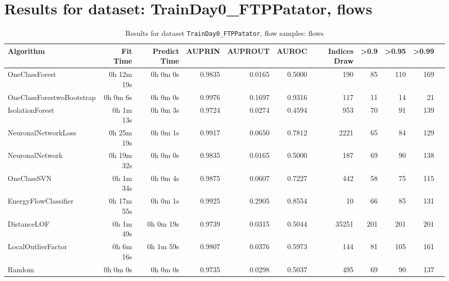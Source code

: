\documentclass{article}
\begin{document}
\section*{Results for dataset: TrainDay0_FTPPatator, flows}
\begin{table}[h!]
\centering
\caption{Results for dataset \texttt{TrainDay0_FTPPatator}, flow samples: flows}
\label{tab:trainday0ftppatator_flows}
\begin{tabular}{lrrrrrrrrrr}
\toprule
Algorithm & Fit Time & Predict Time & AUPRIN & AUPROUT & AUROC & Indices Draw & >0.9 & >0.95 & >0.99 \\
\midrule
OneClassForest & 0h 12m 19s & 0h 0m 0s & 0.9835 & 0.0165 & 0.5000 & 190 & 85 & 110 & 169 \\
OneClassForestwoBootstrap & 0h 0m 6s & 0h 0m 0s & 0.9976 & 0.1697 & 0.9316 & 117 & 11 & 14 & 21 \\
IsolationForest & 0h 1m 13s & 0h 0m 3s & 0.9724 & 0.0274 & 0.4594 & 953 & 70 & 91 & 139 \\
NeuronalNetworkLoss & 0h 25m 19s & 0h 0m 1s & 0.9917 & 0.0650 & 0.7812 & 2221 & 65 & 84 & 129 \\
NeuronalNetwork & 0h 19m 32s & 0h 0m 0s & 0.9835 & 0.0165 & 0.5000 & 187 & 69 & 90 & 138 \\
OneClassSVN & 0h 1m 34s & 0h 0m 4s & 0.9875 & 0.0607 & 0.7227 & 442 & 58 & 75 & 115 \\
EnergyFlowClassifier & 0h 17m 55s & 0h 0m 1s & 0.9925 & 0.2905 & 0.8554 & 10 & 66 & 85 & 131 \\
DistanceLOF & 0h 1m 49s & 0h 0m 19s & 0.9739 & 0.0315 & 0.5044 & 35251 & 201 & 201 & 201 \\
LocalOutlierFactor & 0h 6m 16s & 0h 1m 59s & 0.9807 & 0.0376 & 0.5973 & 144 & 81 & 105 & 161 \\
Random & 0h 0m 0s & 0h 0m 0s & 0.9735 & 0.0298 & 0.5037 & 495 & 69 & 90 & 137 \\
\bottomrule
\end{tabular}
\end{table}
\end{document}
